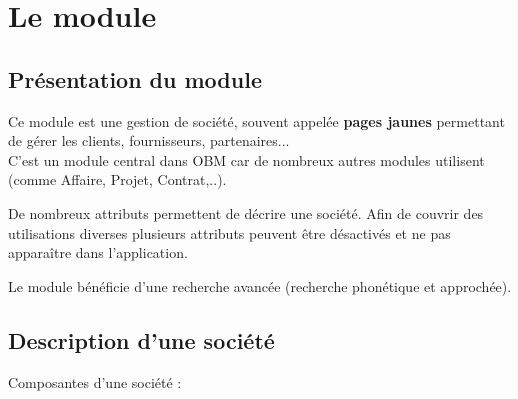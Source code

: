 
\clearpage
\section{Le module \company}

\subsection{Présentation du module \company}

Ce module est une gestion de société, souvent appelée \textbf{pages jaunes} permettant de gérer les clients, fournisseurs, partenaires...\\

C'est un module central dans OBM car de nombreux autres modules utilisent \company (comme Affaire, Projet, Contrat,..).

De nombreux attributs permettent de décrire une société.
Afin de couvrir des utilisations diverses plusieurs attributs peuvent être désactivés et ne pas apparaître dans l'application.

Le module \company bénéficie d'une recherche avancée (recherche phonétique et approchée).

\subsection{Description d'une société}

Composantes d'une société :\\

